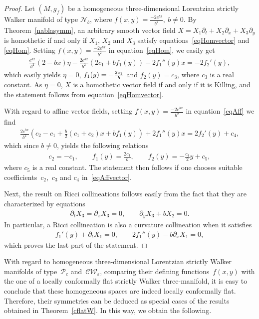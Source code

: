 \documentclass[pdftex]{sigma}
\numberwithin{equation}{section}
\begin{document}
\begin{proof}
Let $(M,g_f)$ be a homogeneous three-dimensional Lorentzian strictly Walker manifold of type $\mathcal N_b$, where $f(x,y)=\frac{-2e^{bx}}{b^2},\ b\neq 0$. By Theorem~\ref{nablasymm}, an arbitrary smooth vector f\/ield $X=X_1\partial_t+X_2\partial_x+X_3\partial_y$ is homothetic if and only if
$X_1$, $X_2$ and $X_3$ satisfy equations~\eqref{eqHomvector} and \eqref{eqHom}. Setting $f(x,y)=\frac{-2e^{bx}}{b^2}$ in equation~\eqref{eqHom}, we easily get
\begin{gather*}
\frac{e^{bx}}{b^2}(2-bx)\eta-\frac{2e^{bx}}{b^2}(2c_1+bf_1(y))-2f_1 ''(y)x=-2f_2 '(y),
\end{gather*}
which easily yields $\eta=0$, $ f_1(y)=-\frac{2{\rm c}_1}{b}$ and $f_2(y)=c_3$, where $c_3$ is a real constant. As $\eta=0$, $X$ is a homothetic vector f\/ield if and only if it is Killing, and the statement follows from equation~\eqref{eqHomvector}.

With regard to af\/f\/ine vector f\/ields, setting $f(x,y)=\frac{-2e^{bx}}{b^2}$ in equation~\eqref{eqAff} we f\/ind
\begin{gather*}
\frac{2e^{bx}}{b^2}\left(c_2-c_1+\frac{b}{2}(c_1+c_2)x+bf_1(y)\right)+2f_1 ''(y) x=2f_2 '(y)+c_4,
\end{gather*}
which since $b\neq 0$, {yields} the following relations
\begin{gather*}
c_2=-c_1,\qquad f_1(y)=\frac{2c_1}{b},\qquad f_2(y)=-\frac{c_4}{2}y+c_5,
\end{gather*}
where $c_5$ is a real constant. The statement then follows {if one chooses} suitable coef\/f\/i\-cients~$c_2$,~$c_3$ and $c_4$ in~\eqref{eqAffvector}.

Next, the result on Ricci collineations follows easily from the fact that they are characterized by equations
\begin{gather*}
\partial_tX_3=\partial_xX_3=0,\qquad \partial_yX_3+bX_2=0.
\end{gather*}
In particular, a Ricci collineation is also a curvature collineation when it satisf\/ies
\begin{gather*}
f_1 '(y)+\partial_tX_1=0,\qquad 2f_1 ''(y)-b\partial_xX_1=0,
\end{gather*}
which proves the last part of the statement.
\end{proof}

With regard to homogeneous three-dimensional Lorentzian strictly Walker manifolds of ty\-pe~$\mathcal P_c$ and~$\mathcal{CW}_\varepsilon$, comparing their def\/ining functions~$f(x,y)$ with the one of a locally conformally f\/lat strictly Walker three-manifold, it is easy to conclude that these homogeneous spaces are indeed locally conformally f\/lat. Therefore, their symmetries can be deduced as special cases of the results obtained in Theorem~\ref{cflatW}. In this way, we obtain the following.
\end{document}
